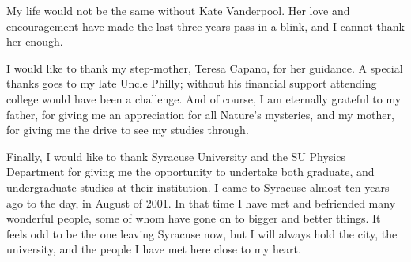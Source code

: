 My life would not be the same without Kate Vanderpool. Her love and
encouragement have made the last three years pass in a blink, and I cannot thank
her enough.

I would like to thank my step-mother, Teresa Capano, for her guidance. A
special thanks goes to my late Uncle Philly; without his financial support
attending college would have been a challenge. And of course, I am eternally
grateful to my father, for giving me an appreciation for all Nature's
mysteries, and my mother, for giving me the drive to see my studies through.

Finally, I would like to thank Syracuse University and the SU Physics
Department for giving me the opportunity to undertake both graduate, and
undergraduate studies at their institution. I came to Syracuse almost ten
years ago to the day, in August of 2001. In that time I have met and befriended
many wonderful people, some of whom have gone on to bigger and better things.
It feels odd to be the one leaving Syracuse now, but I will always hold the
city, the university, and the people I have met here close to my heart.
